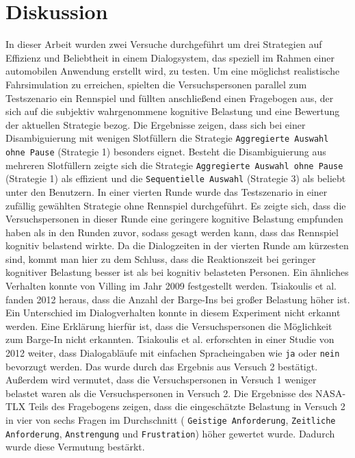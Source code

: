\documentclass[12pt,a4paper]{scrartcl}
\begin{document}
\section{Diskussion}
\label{discussion}
In dieser Arbeit wurden zwei Versuche durchgeführt um drei Strategien auf Effizienz und Beliebtheit in einem Dialogsystem, das speziell im Rahmen einer automobilen Anwendung erstellt wird, zu testen. Um eine möglichst realistische Fahrsimulation zu erreichen, spielten die Versuchspersonen parallel zum Testszenario ein Rennspiel und füllten anschließend einen Fragebogen aus, der sich auf die subjektiv wahrgenommene kognitive Belastung und eine Bewertung der aktuellen Strategie bezog.
Die Ergebnisse zeigen, dass sich bei einer Disambiguierung mit wenigen Slotfüllern die Strategie \texttt{Aggregierte Auswahl ohne Pause} (Strategie 1) besonders eignet. Besteht die Disambiguierung aus mehreren Slotfüllern zeigte sich die Strategie \texttt{Aggregierte Auswahl ohne Pause} (Strategie 1) als effizient und die \texttt{Sequentielle Auswahl} (Strategie 3) als beliebt unter den Benutzern. \newline \newline
In einer vierten Runde wurde das Testszenario in einer zufällig gewählten Strategie ohne Rennspiel durchgeführt. Es zeigte sich, dass die Versuchspersonen in dieser Runde eine geringere kognitive Belastung empfunden haben als in den Runden zuvor, sodass gesagt werden kann, dass das Rennspiel kognitiv belastend wirkte. Da die Dialogzeiten in der vierten Runde am kürzesten sind, kommt man hier zu dem Schluss, dass die Reaktionszeit bei geringer kognitiver Belastung besser ist als bei kognitiv belasteten Personen. Ein ähnliches Verhalten konnte von Villing im Jahr 2009  festgestellt werden. Tsiakoulis et al. fanden 2012 heraus, dass die Anzahl der Barge-Ins bei großer Belastung höher ist. Ein Unterschied im Dialogverhalten konnte in diesem Experiment nicht erkannt werden. Eine Erklärung hierfür ist, dass die Versuchspersonen die Möglichkeit zum Barge-In nicht erkannten. Tsiakoulis et al. erforschten in einer Studie von 2012 weiter, dass Dialogabläufe mit einfachen Spracheingaben wie \texttt{ja} oder \texttt{nein} bevorzugt werden. Das wurde durch das Ergebnis aus Versuch 2 bestätigt. Außerdem wird vermutet, dass die Versuchspersonen in Versuch 1 weniger belastet waren als die Versuchspersonen in Versuch 2. Die Ergebnisse des NASA-TLX Teils des Fragebogens zeigen, dass die eingeschätzte Belastung in Versuch 2 in vier von sechs Fragen im Durchschnitt ( \texttt{Geistige Anforderung}, \texttt{Zeitliche Anforderung}, \texttt{Anstrengung} und \texttt{Frustration}) höher gewertet wurde. Dadurch wurde diese Vermutung bestärkt. \newline \newline
\end{document}
